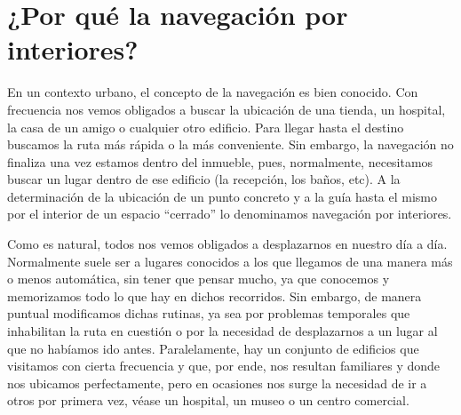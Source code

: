 



\section{¿Por qué la navegación por interiores?}
\label{sec:motivacion}

En un contexto urbano, el concepto de la navegación es bien conocido. Con frecuencia nos vemos obligados a buscar la ubicación de una tienda, un hospital, la casa de un amigo o cualquier otro edificio. Para llegar hasta el destino buscamos la ruta más rápida o la más conveniente. Sin embargo, la navegación no finaliza una vez estamos dentro del inmueble, pues, normalmente, necesitamos buscar un lugar dentro de ese edificio (la recepción, los baños, etc). A la determinación de la ubicación de un punto concreto y a la guía hasta el mismo por el interior de un espacio ``cerrado'' lo denominamos navegación por interiores.

Como es natural, todos nos vemos obligados a desplazarnos en nuestro día a día. Normalmente suele ser a lugares conocidos a los que llegamos de una manera más o menos automática, sin tener que pensar mucho, ya que conocemos y memorizamos todo lo que hay en dichos recorridos. Sin embargo, de manera puntual modificamos dichas rutinas, ya sea por problemas temporales que inhabilitan la ruta en cuestión o por la necesidad de desplazarnos a un lugar al que no habíamos ido antes. Paralelamente, hay un conjunto de edificios que visitamos con cierta frecuencia y que, por ende, nos resultan familiares y donde nos ubicamos perfectamente, pero en ocasiones nos surge la necesidad de ir a otros por primera vez, véase un hospital, un museo o un centro comercial. 

